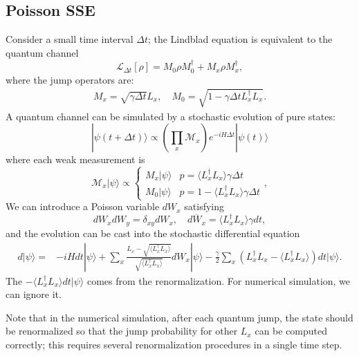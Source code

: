 \documentclass{SciPost}
\begin{document}
\subsection{Poisson SSE}
Consider a small time interval $\Delta t$; the Lindblad equation is equivalent to the quantum channel 
\begin{equation}
	\mathcal{L}_{\Delta t}[\rho] = M_0 \rho M_0^\dagger + M_x \rho M_x^\dagger,
\end{equation}
where the jump operators are:
\begin{equation}
\begin{aligned}
	M_x = \sqrt{\gamma\Delta t} L_x, \quad
	M_0 = \sqrt{1 - \gamma \Delta t L_x^\dagger L_x}.
\end{aligned}
\end{equation}
A quantum channel can be simulated by a stochastic evolution of pure states:
\begin{equation}
	|\psi(t+\Delta t)\rangle \propto \left(\prod_{x} \mathcal{M}_x\right) e^{-i H\Delta t}|\psi(t)\rangle
\end{equation}
where each weak measurement is
\begin{equation}
	\mathcal{M}_x|\psi\rangle \propto \begin{cases}
		M_x |\psi\rangle & p = \langle L_x^\dagger L_x\rangle \gamma\Delta t \\
		M_0 |\psi\rangle & p = 1-\langle L_x^\dagger L_x\rangle \gamma\Delta t
	\end{cases},
\end{equation}
We can introduce a Poisson variable $dW_x$ satisfying 
\begin{equation}
	dW_x dW_y = \delta_{xy} dW_x,\quad \overline{dW_x} = \langle L_x^\dagger L_x\rangle\gamma dt,
\end{equation}
and the evolution can be cast into the stochastic differential equation
\begin{equation}
\begin{aligned}
	d|\psi\rangle = & -iHdt |\psi\rangle + \sum_x \frac{L_x-\sqrt{\langle L_x^\dagger L_x\rangle}}{\sqrt{\langle L_x^\dagger L_x\rangle}}dW_x|\psi\rangle - \frac{\gamma}{2} \sum_x \left(L_x^\dagger L_x-\langle L_x^\dagger L_x\rangle\right)dt 
	  |\psi\rangle.
\end{aligned}
\end{equation}
The $-\langle L_x^\dagger L_x\rangle dt |\psi\rangle$ comes from the renormalization. 
For numerical simulation, we can ignore it.

Note that in the numerical simulation, after each quantum jump, the state should be renormalized so that the jump probability for other $L_x$ can be computed correctly; this requires several renormalization procedures in a single time step. 
\end{document}
